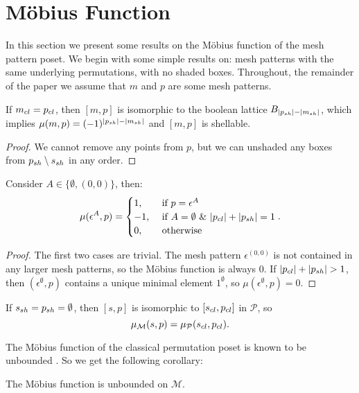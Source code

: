 \documentclass[11pt,a4paper,oneside]{article}
\begin{document}
\section{M\"obius Function}\label{sec:MF}
In this section we present some results on the M\"obius function of the mesh pattern poset.
We begin with some simple results on: mesh patterns with the same underlying permutations,
with no shaded boxes. Throughout, the remainder of the paper we assume that $m$ and $p$ are
some mesh patterns.
\begin{lem}
If $m_{cl}=p_{cl}$, then $[m,p]$ is isomorphic to the boolean lattice
$B_{|p_{sh}|-|m_{sh}|}$, which implies $\mu(m,p)=(-1)^{|p_{sh}|-|m_{sh}|}$ and
$[m,p]$ is shellable.
\begin{proof}
We cannot remove any points from $p$, but we can
unshaded any boxes from $p_{sh}\setminus s_{sh}$ in any order.
\end{proof}
\end{lem}

\begin{lem}
Consider $A\in\{\emptyset,(0,0)\}$, then:
$$\mu(\epsilon^{A},p)=\begin{cases}
1,&\mbox{ if }p=\epsilon^A \\
-1,&\mbox{ if }A=\emptyset\,\,\&\,\,|p_{cl}|+|p_{sh}|=1\\
0,&\mbox{ otherwise}
\end{cases}.$$
\begin{proof}
The first two cases are trivial. The
mesh pattern $\epsilon^{(0,0)}$ is not contained in any larger mesh patterns, so
the M\"obius function is always $0$. If $|\cl{p}|+|\sh{p}|>1$, then
$(\epsilon^\emptyset,p)$ contains a unique minimal element $1^\emptyset$, so
$\mu(\epsilon^\emptyset,p)=0$.
\end{proof}
\end{lem}

\begin{lem}
If $s_{sh}=p_{sh}=\emptyset$, then $[s,p]$ is isomorphic to
$[s_{cl},p_{cl}]$ in $\mathcal{P}$, so $$\operatorname{\mu_\mathcal{M}}(s,p)=\operatorname{\mu_\mathcal{P}}(s_{cl},p_{cl}).$$
\end{lem}

The M\"obius function of the classical permutation poset is known to be
unbounded \cite{Smith13}. So we get the following corollary:

\begin{cor}
The M\"obius function is unbounded on $\mathcal{M}$.
\end{cor}
\end{document}
